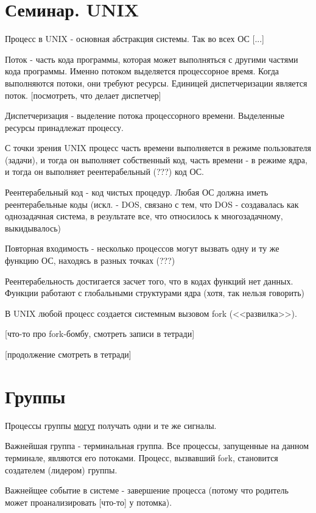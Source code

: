 \documentclass[14pt, a4paper]{article}
\begin{document}
	\section{Семинар. UNIX}
	
	Процесс в UNIX - основная абстракция системы.
	Так во всех ОС [...]
	
	Поток - часть кода программы, которая может выполняться с другими частями кода программы. Именно потоком выделяется процессорное время.
	Когда выполняются потоки, они требуют ресурсы. Единицей диспетчеризации является поток. [посмотреть, что делает диспетчер]
	
	Диспетчеризация - выделение потока процессорного времени. Выделенные ресурсы принадлежат процессу.
	
	С точки зрения UNIX процесс часть времени выполняется в режиме пользователя (задачи), и тогда он выполняет собственный код, часть времени -
	в режиме ядра, и тогда он выполняет реентерабельный (???) код ОС.
	
	Реентерабельный код - код чистых процедур. Любая ОС должна иметь реентерабельные коды (искл. - DOS, связано с тем, что DOS - создавалась как однозадачная система, в результате все, что относилось к многозадачному, выкидывалось)
	
	Повторная входимость - несколько процессов могут вызвать одну и ту же функцию ОС, находясь в разных точках (???)
	
	Реентерабельность достигается засчет того, что в кодах функций нет данных. Функции работают с глобальными структурами ядра (хотя, так нельзя говорить)
	
	В UNIX любой процесс создается системным вызовом fork (<<развилка>>).
	
	[что-то про fork-бомбу, смотреть записи в тетради]
	
	[продолжение смотреть в тетради]
	
	\section{Группы}
	
	Процессы группы \underline{могут} получать одни и те же сигналы.
	
	Важнейшая группа - терминальная группа. Все процессы, запущенные на данном терминале, являются его потоками.
	Процесс, вызвавший fork, становится создателем (лидером) группы.
	
	Важнейщее событие в системе - завершение процесса (потому что родитель может проанализировать [что-то] у потомка).
	
\end{document}
